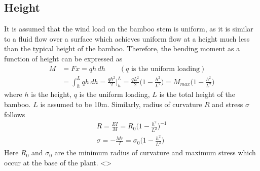 \documentclass[openright,twoside]{iitkthesis}
\begin{document}
\subsection{Height}
It is assumed that the wind load on the bamboo stem is uniform, as it is similar to a fluid flow over a surface which achieves uniform flow at a height much less than the typical height of the bamboo. Therefore, the bending moment as a function of height can be expressed as
\begin{equation}
\begin{split}
M &= Fx = qh\,dh \qquad (q \text{ is the uniform loading})\\
&= \int_{h}^Lqh\,dh = \frac{qh^2}{2}\bigg|^L_h = \frac{qL^2}{2}\bigg(1-\frac{h^2}{L^2}\bigg) = M_{max}\bigg(1-\frac{h^2}{L^2}\bigg)
\end{split}
\end{equation}
where $h$ is the height, $q$ is the uniform loading, $L$ is the total height of the bamboo. $L$ is assumed to be 10m.
Similarly, radius of curvature $R$ and stress $\sigma$ follows
\begin{eqnarray}
R = \frac{EI}{M} = R_0\bigg(1-\frac{h^2}{L^2}\bigg)^{-1}\\
\sigma = -\frac{Mr}{I} = \sigma_0\bigg(1-\frac{h^2}{L^2}\bigg)
\end{eqnarray}
Here $R_0$ and $\sigma_0$ are the minimum radius of curvature and maximum stress which occur at the base of the plant. 
<>
\end{document}
